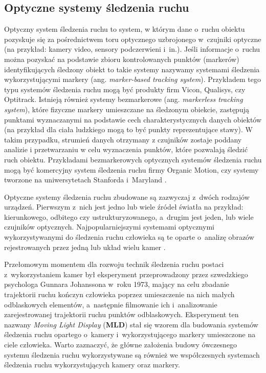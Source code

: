 \subsection{Optyczne systemy śledzenia ruchu}
Optyczny system śledzenia ruchu to system, w którym dane o~ruchu obiektu pozyskuje się za pośrednictwem toru optycznego uzbrojonego w~czujniki optyczne (na przykład: kamery video, sensory podczerwieni i~in.). Jeśli informacje o~ruchu można pozyskać na podstawie zbioru kontrolowanych punktów (markerów) identyfikujących śledzony obiekt to takie systemy nazywamy systemami śledzenia wykorzystującymi markery (ang. \textsl{marker-based tracking system}). Przykładem tego typu systemów śledzenia ruchu mogą być produkty firm Vicon, Qualisys, czy Optitrack. Istnieją również systemy bezmarkerowe (ang. \textsl{markerless tracking system}), które fizyczne markery umieszczane na śledzonym obiekcie, zastępują punktami wyznaczanymi na podstawie cech charakterystycznych danych obiektów (na przykład dla ciała ludzkiego mogą to być punkty reprezentujące stawy). W takim przypadku, strumień danych otrzymany z czujników zostaje poddany analizie i przetwarzaniu w celu wyznaczenia punktów, które pozwalają śledzić ruch obiektu. Przykładami bezmarkerowych optycznych systemów śledzenia ruchu mogą być komercyjny system śledzenia ruchu firmy Organic Motion, czy systemy tworzone na uniwersytetach Stanforda i~Maryland \cite{Sundaresan2005,Sundaresan2007}.

Optyczne systemy śledzenia ruchu zbudowane są zazwyczaj z~dwóch rodzajów urządzeń. Pierwszym z~nich jest jedno lub wiele źródeł światła na przykład: kierunkowego, odbitego czy ustrukturyzowanego, a~drugim jest jeden, lub wiele czujników optycznych. Najpopularniejszymi systemami optycznymi wykorzystywanymi do śledzenia ruchu człowieka są te oparte o~analizę obrazów rejestrowanych przez jedną \cite{schmidt2006kernel,RuiLi2006} lub układ wielu kamer \cite{Sundaresan2005,Krzeszowski2013}.

Przełomowym momentem dla rozwoju technik śledzenia ruchu postaci z~wykorzystaniem kamer był eksperyment przeprowadzony przez szwedzkiego psychologa Gunnara Johanssona w~roku 1973, mający na celu zbadanie trajektorii ruchu kończyn człowieka poprzez umieszczenie na nich małych odblaskowych elementów, a~następnie filmowanie ich i~analizowanie zarejestrowanej trajektorii ruchu punktów odblaskowych. Eksperyment ten nazwany \emph{Moving Light Display} (\textbf{MLD}) \cite{Johansson1973} stał się wzorem dla budowania systemów śledzenia ruchu opartego o~kamery i~wykorzystującego markery umieszczone na ciele człowieka. Warto zaznaczyć, że główne założenia budowy ówczesnego systemu śledzenia ruchu wykorzystywane są również we współczesnych systemach śledzenia ruchu wykorzystujących kamery oraz markery.

